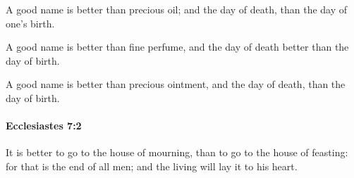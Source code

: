 			\begin{versebox}
					\item[BHS] 
					\item[LXX] 
					\item[ASV] A good name is better than precious oil; and the day of death, than the day of one's birth.
					\item[NIV] A good name is better than fine perfume, and the day of death better than the day of birth.
					\item[NRSV] A good name is better than precious ointment, and the day of death, than the day of birth.
			\end{versebox}

		\paragraph{Ecclesiastes 7:2} %
			\label{ECCLESIASTES-7-2}

			It is better to go to the house of mourning, than to go to the house of feasting: for that is the end of all men; and the living will lay it to his heart.

